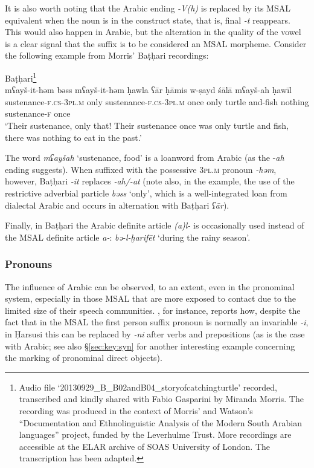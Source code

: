 \documentclass[output=paper]{langsci/langscibook}
\begin{document}
It is also worth noting that the Arabic ending \textit{-V(h)} is replaced by its MSAL equivalent when the noun is in the construct state, that is, final \textit{-t} reappears. This would also happen in Arabic, but the alteration in the quality of the vowel is a clear signal that the suffix is to be considered an MSAL morpheme. Consider the following example from Morris’ Baṭḥari recordings: 

\ea
Baṭḥari\footnote{Audio 
  file ‘20130929\_B\_B02andB04\_storyofcatchingturtle’ recorded, transcribed and kindly shared with Fabio Gasparini by Miranda Morris. The recording was produced in the context of Morris’ and Watson’s “Documentation and Ethnolinguistic Analysis of the Modern South Arabian languages” project, funded by the Leverhulme Trust. More recordings are accessible at the ELAR archive of SOAS University of London. The transcription has been adapted.
  }\\
\gll mʕayš-it-həm bəss mʕayš-it-həm ḥawla ʕār ḥāmis w-ṣayd śālā mʕayš-ah ḥawīl\\
     sustenance-\textsc{f.cs-3pl.m} only sustenance-\textsc{f.cs-3pl.m} once only turtle and-fish nothing sustenance-\textsc{f} once\\
\glt `Their sustenance, only that! Their sustenance once was only turtle and fish, there was nothing to eat in the past.'
\z
 

The word \textit{mʕayšah} ‘sustenance, food’ is a loanword from Arabic (as the -\textit{ah} ending suggests). When suffixed with the possessive \textsc{3pl.m} pronoun \textit{-həm}, however, Baṭḥari \textit{-it} replaces \textit{-ah/-at} (note also, in the example, the use of the restrictive adverbial particle \textit{bəss} ‘only’, which is a well-integrated loan from dialectal Arabic and occurs in alternation with Baṭḥari \textit{ʕār}). 

Finally, in Baṭḥari the Arabic definite article \textit{(a)l-} is occasionally used instead of the MSAL definite article \textit{a-}:  \textit{bə-l-ḫarifēt} ‘during the rainy season'.


 \subsubsection{Pronouns}\label{sec:key:pro}

The influence of Arabic can be observed, to an extent, even in the pronominal system, especially in those MSAL that are more exposed to contact due to the limited size of their speech communities. \citet{Lonnet2011}, for instance, reports how, despite the fact that in the MSAL the first person suffix pronoun is normally an invariable \textit{-i}, in Ḥarsusi this can be replaced by \textit{-ni} after verbs and prepositions (as is the case with Arabic; see also §\ref{sec:key:syn} for another interesting example concerning the marking of pronominal direct objects).
\end{document}
